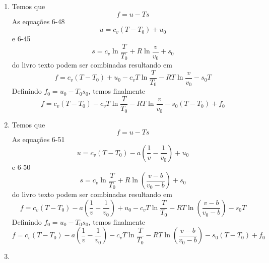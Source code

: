 \documentclass[12pt,a4paper,brazilian]{article}
\def\Description{Termodinâmica -- Prova 2}
\begin{document}
\newpage
\def\Description{Termodinâmica -- Gabarito}

\begin{enumerate}
    \item Temos que
        \[
            f=u-Ts
        \]
        As equações 6-48
        \[
            u=c_v(T-T_0) +u_0
        \]
        e 6-45
        \[
            s=c_v\ln\frac{T}{T_0}+R\ln\frac{v}{v_0} + s_0
        \]
        do livro texto podem ser combinadas resultando em
        \[
            f=c_v(T-T_0) +u_0 - 
            c_vT\ln\frac{T}{T_0}-RT\ln\frac{v}{v_0} - s_0T
        \]
        Definindo \(f_0 = u_0-T_0s_0\), temos finalmente
        \[
            f=c_v(T-T_0) - 
            c_vT\ln\frac{T}{T_0}-RT\ln\frac{v}{v_0} - s_0(T-T_0) +f_0
        \]

    \item Temos que
        \[
            f=u-Ts
        \]
        As equações 6-51
        \[
            u=c_v(T-T_0)-a\left(\frac{1}{v}-\frac{1}{v_0}\right)+ u_0
        \]
        e 6-50 
        \[
            s=c_v\ln\frac{T}{T_0}+R\ln\left(\frac{v-b}{v_0-b}\right)+s_0
        \]
        do livro texto podem ser combinadas resultando em
        \[
            f=
            c_v(T-T_0)-a\left(\frac{1}{v}-\frac{1}{v_0}\right)+ u_0 -
            c_vT\ln\frac{T}{T_0}-RT\ln\left(\frac{v-b}{v_0-b}\right)-s_0T
        \]
        Definindo \(f_0 = u_0-T_0s_0\), temos finalmente
        \[
            f=
            c_v(T-T_0)-a\left(\frac{1}{v}-\frac{1}{v_0}\right) -
            c_vT\ln\frac{T}{T_0}-RT\ln\left(\frac{v-b}{v_0-b}\right)-s_0(T-T_0)+f_0
        \]

    \item 

\end{enumerate}
\end{document}
